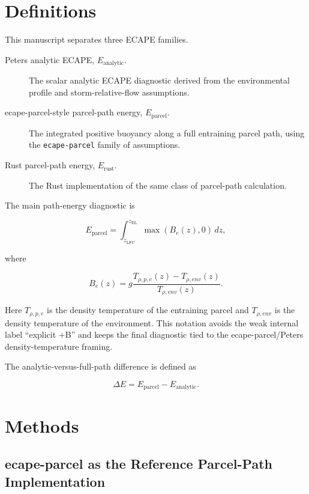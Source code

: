 \documentclass[11pt]{article}
\begin{document}
\section{Definitions}

This manuscript separates three ECAPE families.

\begin{description}
  \item[Peters analytic ECAPE, $E_{\mathrm{analytic}}$.] The scalar analytic ECAPE diagnostic derived from the environmental profile and storm-relative-flow assumptions.
  \item[ecape-parcel-style parcel-path energy, $E_{\mathrm{parcel}}$.] The integrated positive buoyancy along a full entraining parcel path, using the \texttt{ecape-parcel} family of assumptions.
  \item[Rust parcel-path energy, $E_{\mathrm{rust}}$.] The Rust implementation of the same class of parcel-path calculation.
\end{description}

The main path-energy diagnostic is

\begin{equation}
E_{\mathrm{parcel}} =
\int_{z_{\mathrm{LFC}}}^{z_{\mathrm{EL}}} \max(B_e(z),0)\,dz,
\end{equation}

where

\begin{equation}
B_e(z)=g\frac{T_{\rho,p,e}(z)-T_{\rho,env}(z)}{T_{\rho,env}(z)}.
\end{equation}

Here $T_{\rho,p,e}$ is the density temperature of the entraining parcel and $T_{\rho,env}$ is the density temperature of the environment. This notation avoids the weak internal label ``explicit +B'' and keeps the final diagnostic tied to the ecape-parcel/Peters density-temperature framing.

The analytic-versus-full-path difference is defined as

\begin{equation}
\Delta E = E_{\mathrm{parcel}} - E_{\mathrm{analytic}}.
\end{equation}

\section{Methods}

\subsection{ecape-parcel as the Reference Parcel-Path Implementation}
\end{document}
